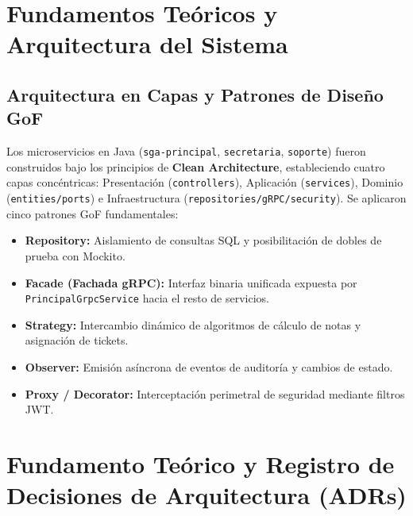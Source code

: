 \documentclass[11pt,a4paper]{article}
\begin{document}
\section{Fundamentos Te\'oricos y Arquitectura del Sistema}
\label{sec:fundamentos}

\subsection{Arquitectura en Capas y Patrones de Dise\~no GoF}
Los microservicios en Java (\texttt{sga-principal}, \texttt{secretaria}, \texttt{soporte}) fueron construidos bajo los principios de \textbf{Clean Architecture}, estableciendo cuatro capas conc\'entricas: Presentaci\'on (\texttt{controllers}), Aplicaci\'on (\texttt{services}), Dominio (\texttt{entities/ports}) e Infraestructura (\texttt{repositories/gRPC/security}). Se aplicaron cinco patrones GoF fundamentales:
\begin{itemize}[noitemsep]
  \item \textbf{Repository:} Aislamiento de consultas SQL y posibilitaci\'on de dobles de prueba con Mockito.
  \item \textbf{Facade (Fachada gRPC):} Interfaz binaria unificada expuesta por \texttt{PrincipalGrpcService} hacia el resto de servicios.
  \item \textbf{Strategy:} Intercambio din\'amico de algoritmos de c\'alculo de notas y asignaci\'on de tickets.
  \item \textbf{Observer:} Emisi\'on as\'incrona de eventos de auditor\'ia y cambios de estado.
  \item \textbf{Proxy / Decorator:} Interceptaci\'on perimetral de seguridad mediante filtros JWT.
\end{itemize}

\newpage

\section{Fundamento Te\'orico y Registro de Decisiones de Arquitectura (ADRs)}
\label{sec:fundamento}
\end{document}
